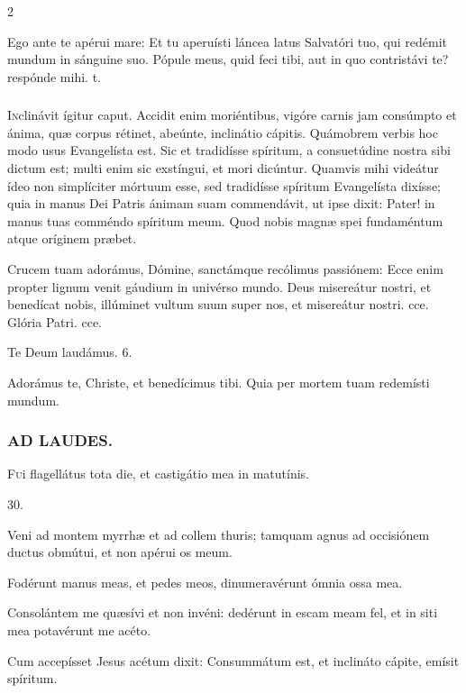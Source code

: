 \documentclass[9pt,twoside]{extarticle}
\begin{document}
\begin{multicols}{2}
\begin{tightlist}{}
\item {} Ego ante te apérui mare: \textred{*} Et tu aperuísti láncea latus Salvatóri tuo, qui redémit mundum in sánguine suo.  Pópule meus, quid feci tibi, aut in quo contristávi te? respónde mihi. t.
\end{tightlist}

\subsubsection*{\center{}}
\lettrine{I}nclinávit ígitur caput. Accidit enim moriéntibus, vigóre carnis jam consúmpto et ánima, quæ corpus rétinet, abeúnte, inclinátio cápitis. Quámobrem verbis hoc modo usus Evangelísta est. Sic et tradidísse spíritum, a consuetúdine nostra sibi dictum est; multi enim sic exstíngui, et mori dicúntur. Quamvis mihi videátur ídeo non simplíciter mórtuum esse, sed tradidísse spíritum Evangelísta dixísse; quia in manus Dei Patris ánimam suam commendávit, ut ipse dixit: Pater! in manus tuas comméndo spíritum meum. Quod nobis magnæ spei fundaméntum atque oríginem præbet.

\begin{tightlist}{}
\item {} Crucem tuam adorámus, Dómine, sanctámque recólimus passiónem: \textred{*} Ecce enim propter lignum venit gáudium in univérso mundo.  Deus misereátur nostri, et benedícat nobis, illúminet vultum suum super nos, et misereátur nostri. cce. Glória Patri. cce.
\item Te Deum laudámus. 6.
\item {} Adorámus te, Christe, et benedícimus tibi.  Quia per mortem tuam redemísti mundum.
\end{tightlist}

\subsubsection*{\center \textsc{AD LAUDES.}}
\begin{center}\end{center}
\lettrine{F}ui flagellátus tota die, et castigátio mea in matutínis.

\begin{tightlist}{}
\item {} 30. 
\item {} Veni ad montem myrrhæ et ad collem thuris; tamquam agnus ad occisiónem ductus obmútui, et non apérui os meum.
\item {} Fodérunt manus meas, et pedes meos, dinumeravérunt ómnia ossa mea.
\item {} Consolántem me quæsívi et non invéni: dedérunt in escam meam fel, et in siti mea potavérunt me acéto.
\item {} Cum accepísset Jesus acétum dixit: Consummátum est, et inclináto cápite, emísit spíritum.
\end{tightlist}


\end{multicols}
\end{document}
